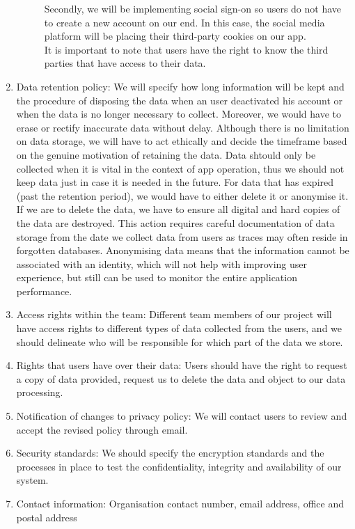 \begin{enumerate}
\begin{description}
        Secondly, we will be implementing social sign-on so users do not have to create a new account on our end. In this case, the social media 
        platform will be placing their third-party cookies on our app.
        \\It is important to note that users have the right to know the third parties that have access to their data.
    \end{description}
    \item Data retention policy: We will specify how long information will be kept and the procedure of disposing the data when an user deactivated
    his account or when the data is no longer necessary to collect. Moreover, we would have to erase or rectify inaccurate data without delay. Although 
    there is no limitation on data storage, we will have to act ethically and
    decide the timeframe based on the genuine motivation of retaining the data. Data shtould only be collected when it is vital in the context
    of app operation, thus we should not keep data just in case it is needed in the future. For data that has expired (past the retention period), we 
    would have to either delete it or anonymise it. If we are to delete the data, we have to ensure all digital and hard copies of the data are destroyed. 
    This action requires careful documentation of data storage from the date we collect data from users as traces may often reside in forgotten databases.
    Anonymising data means that the information cannot be associated with an identity, which will not help with improving user experience, but still can be used
    to monitor the entire application performance.
    \item Access rights within the team: Different team members of our project will have access rights to different types of data collected from
    the users, and we should delineate who will be responsible for which part of the data we store.
    \item Rights that users have over their data: Users should have the right to request a copy of data provided, request us to delete the data and object to our data processing.
    \item Notification of changes to privacy policy: We will contact users to review and accept the revised policy through email.
    \item Security standards: We should specify the encryption standards and the processes in place to test the confidentiality, integrity and availability of 
    our system.
    \item Contact information: Organisation contact number, email address, office and postal address
\end{enumerate}

